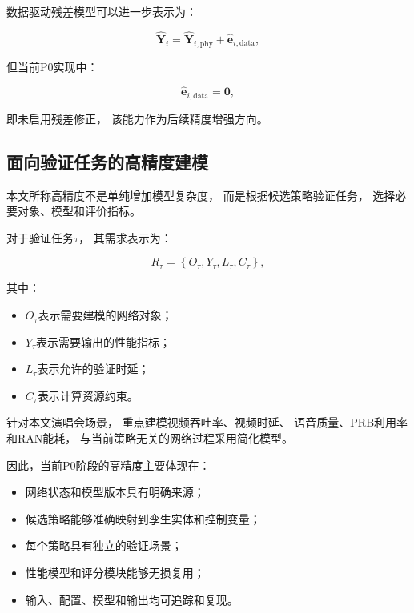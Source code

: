 \documentclass[lang=cn,12pt]{elegantbook}
\begin{document}
数据驱动残差模型可以进一步表示为：

\begin{equation}
\hat{\boldsymbol{Y}}_i
=
\hat{\boldsymbol{Y}}_{i,\mathrm{phy}}
+
\hat{\boldsymbol{e}}_{i,\mathrm{data}},
\label{eq:future_hybrid_twin_prediction}
\end{equation}

但当前P0实现中：

\begin{equation}
\hat{\boldsymbol{e}}_{i,\mathrm{data}}
=
\boldsymbol{0},
\end{equation}

即未启用残差修正，
该能力作为后续精度增强方向。


\subsection*{面向验证任务的高精度建模}

本文所称高精度不是单纯增加模型复杂度，
而是根据候选策略验证任务，
选择必要对象、模型和评价指标。

对于验证任务$\tau$，
其需求表示为：

\begin{equation}
R_{\tau}
=
\left\{
O_{\tau},
Y_{\tau},
L_{\tau},
C_{\tau}
\right\},
\label{eq:task_model_requirement}
\end{equation}

其中：

\begin{itemize}
    \item $O_{\tau}$表示需要建模的网络对象；
    \item $Y_{\tau}$表示需要输出的性能指标；
    \item $L_{\tau}$表示允许的验证时延；
    \item $C_{\tau}$表示计算资源约束。
\end{itemize}

针对本文演唱会场景，
重点建模视频吞吐率、视频时延、
语音质量、PRB利用率和RAN能耗，
与当前策略无关的网络过程采用简化模型。

因此，当前P0阶段的高精度主要体现在：

\begin{itemize}
    \item 网络状态和模型版本具有明确来源；
    \item 候选策略能够准确映射到孪生实体和控制变量；
    \item 每个策略具有独立的验证场景；
    \item 性能模型和评分模块能够无损复用；
    \item 输入、配置、模型和输出均可追踪和复现。
\end{itemize}
\end{document}
